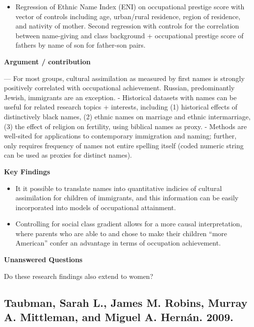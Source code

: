 \documentclass[
]{book}
\providecommand{\tightlist}{%
  \setlength{\itemsep}{0pt}\setlength{\parskip}{0pt}}
\begin{document}
\begin{itemize}
\tightlist
\item
  Regression of Ethnic Name Index (ENI) on occupational prestige score with vector of controls including age, urban/rural residence, region of residence, and nativity of mother. Second regression with controls for the correlation between name-giving and class background + occupational prestige score of fathers by name of son for father-son pairs.
\end{itemize}

\textbf{Argument / contribution}

--- For most groups, cultural assimilation as measured by first names is strongly positively correlated with occupational achievement. Russian, predominantly Jewish, immigrants are an exception.
- Historical datasets with names can be useful for related research topics + interests, including (1) historical effects of distinctively black names, (2) ethnic names on marriage and ethnic intermarriage, (3) the effect of religion on fertility, using biblical names as proxy.
- Methods are well-sited for applications to contemporary immigration and naming; further, only requires frequency of names not entire spelling itself (coded numeric string can be used as proxies for distinct names).

\textbf{Key Findings}

\begin{itemize}
\tightlist
\item
  It it possible to translate names into quantitative indicies of cultural assimilation for children of immigrants, and this information can be easily incorporated into models of occupational attainment.
\item
  Controlling for social class gradient allows for a more causal interpretation, where parents who are able to and chose to make their children ``more American'' confer an advantage in terms of occupation achievement.
\end{itemize}

\textbf{Unanswered Questions}

Do these research findings also extend to women?

\hypertarget{taubman-sarah-l.-james-m.-robins-murray-a.-mittleman-and-miguel-a.-hernuxe1n.-2009.}{%
\subsection*{Taubman, Sarah L., James M. Robins, Murray A. Mittleman, and Miguel A. Hernán. 2009.}\label{taubman-sarah-l.-james-m.-robins-murray-a.-mittleman-and-miguel-a.-hernuxe1n.-2009.}}
\end{document}
